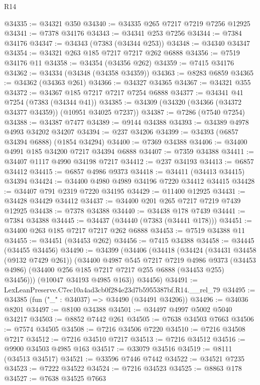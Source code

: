 \begin{lexlean}{R14}
\begin{coremodule}
@34335 := @34321 @350
@34340 := @34335 @265 @7217 @7219 @7256 @12925
@34341 := @7378 @34176
@34343 := @34341 @253 @7256
@34344 := @7384 @34176
@34347 := @34343 (@7383 (@34344 @253))
@34348 := @34340 @34347
@34354 := @34321 @263 @185 @7217 @7217 @262 @6888
@34356 := @7519 @34176 @11
@34358 := @34354 (@34356 @262)
@34359 := @7415 @34176
@34362 := @34334 (@34348 (@34358 @34359))
@34363 := @8283 @6859
@34365 := @34362 (@34363 @261)
@34366 := @34327 @34365
@34367 := @34321 @355
@34372 := @34367 @185 @7217 @7217 @7254 @6888
@34377 := @34341 @41 @7254 (@7383 (@34344 @41))
@34385 := @34309 (@34320 (@34366 (@34372 @34377 @34359)) (@10951 @34025 @7237))
@34387 := @7286 (@7540 @7254)
@34388 := @34387 @7477
@34389 := @9144 @34388
@34393 := @34389 @4978 @4993 @34202 @34207
@34394 := @237 @34206
@34399 := @34393 (@6857 @34394 @6888) (@1854 @34294)
@34400 := @7369 @34388
@34406 := @34400 @4991 @185 @34200 @7217 @34394 @6888
@34407 := @7359 @34388
@34411 := @34407 @1117 @4990 @34198 @7217
@34412 := @237 @34193
@34413 := @6857 @34412
@34415 := @6857 @4986 @9373
@34418 := @34411 (@34413 @34415) @34394
@34424 := @34400 @4980 @4989 @34196 @7220 @34412 @34415
@34428 := @34407 @791 @2319 @7220 @34195
@34429 := @11400 @12925
@34431 := @34428 @34429 @34412
@34437 := @34400 @201 @265 @7217 @7219 @7439 @12925
@34438 := @7378 @34388
@34440 := @34438 @178 @7439
@34441 := @7384 @34388
@34445 := @34437 (@34440 (@7383 (@34441 @178)))
@34451 := @34400 @263 @185 @7217 @7217 @262 @6888
@34453 := @7519 @34388 @11
@34455 := @34451 (@34453 @262)
@34456 := @7415 @34388
@34458 := @34445 (@34455 @34456)
@34490 := @34399
    (@34406
      (@34418
        (@34424
          (@34431 @34458 (@9132 @7429 @261))
          (@34400
            @4987
            @545
            @7217
            @7219
            @4986
            @9373
            (@34453 @4986)
            (@34400 @256 @185 @7217 @7217 @255 @6888 (@34453 @255) @34456)))
        (@10047 @34193 @4985 @163))
      @34456)
@34491 := LexLeanPreserve.C7ec10a4ad3cb0f284e23d7b5955387bf.R14.__rel_79
@34495 := @34385 (fun ("_" : @34037) => @34490 (@34491 @34206))
@34496 := @34036 @8201
@34497 := @8100 @34388
@34501 := @34497 @4997 @5002 @5040 @34217
@34503 := @8852 @7442 @261
@34505 := @7638 @34503 @7663
@34506 := @7574 @34505
@34508 := @7216 @34506 @7220
@34510 := @7216 @34508 @7217
@34512 := @7216 @34510 @7217
@34513 := @7216 @34512
@34516 := @9900 @34503 @4985 @163
@34517 := @33079 @34516
@34519 := @8111 (@34513 @34517)
@34521 := @33596 @7446 @7442
@34522 := @34521 @7235
@34523 := @7222 @34522
@34524 := @7216 @34523
@34525 := @8863 @178
@34527 := @7638 @34525 @7663

\end{coremodule}
\end{lexlean}
